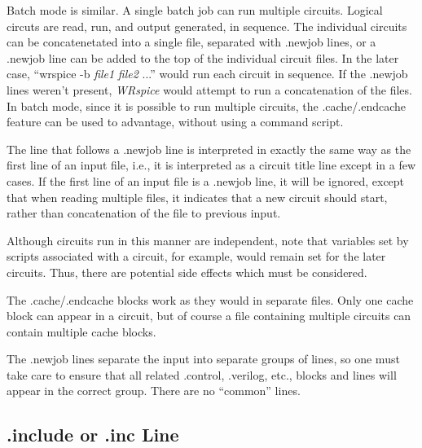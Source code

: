 Batch mode is similar.  A single batch job can run multiple circuits. 
Logical circuts are read, run, and output generated, in sequence.  The
individual circuits can be concatenetated into a single file,
separated with {\vt .newjob} lines, or a {\vt .newjob} line can be
added to the top of the individual circuit files.  In the later case,
``{\vt wrspice -b} {\it file1} {\it file2} ...'' would run each
circuit in sequence.  If the {\vt .newjob} lines weren't present, {\it
WRspice} would attempt to run a concatenation of the files.  In batch
mode, since it is possible to run multiple circuits, the {\vt
.cache}/{\vt .endcache} feature can be used to advantage, without
using a command script.

The line that follows a {\vt .newjob} line is interpreted in exactly
the same way as the first line of an input file, i.e., it is
interpreted as a circuit title line except in a few cases.  If the
first line of an input file is a {\vt .newjob} line, it will be
ignored, except that when reading multiple files, it indicates that a
new circuit should start, rather than concatenation of the file to
previous input.

Although circuits run in this manner are independent, note that
variables set by scripts associated with a circuit, for example, would
remain set for the later circuits.  Thus, there are potential side
effects which must be considered.

The {\vt .cache}/{\vt .endcache} blocks work as they would in separate
files.  Only one cache block can appear in a circuit, but of course a
file containing multiple circuits can contain multiple cache blocks.

The {\vt .newjob} lines separate the input into separate groups of
lines, so one must take care to ensure that all related {\vt
.control}, {\vt .verilog}, etc., blocks and lines will appear in the
correct group.  There are no ``common'' lines.

\subsection{{\vt .include} or {\vt .inc} Line}

